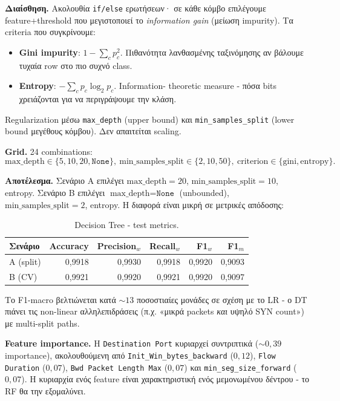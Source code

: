 \documentclass[12pt,a4paper,twoside]{book}
\begin{document}
\textbf{Διαίσθηση.} Ακολουθία \texttt{if/else} ερωτήσεων· σε κάθε
κόμβο επιλέγουμε feature+threshold που μεγιστοποιεί το
\emph{information gain} (μείωση impurity). Τα criteria που
συγκρίνουμε:
\begin{itemize}
    \item \textbf{Gini impurity}: \(1 - \sum_c p_c^2\). Πιθανότητα
    λανθασμένης ταξινόμησης αν βάλουμε τυχαία row στο πιο συχνό class.
    \item \textbf{Entropy}: \(-\sum_c p_c \log_2 p_c\). Information-
    theoretic measure - πόσα bits χρειάζονται για να περιγράψουμε την
    κλάση.
\end{itemize}
Regularization μέσω \texttt{max\_depth} (upper bound) και
\texttt{min\_samples\_split} (lower bound μεγέθους κόμβου). Δεν
απαιτείται scaling.

\textbf{Grid.} 24 combinations:
\[
\text{max\_depth}\in\{5,10,20,\texttt{None}\},\
\text{min\_samples\_split}\in\{2,10,50\},\
\text{criterion}\in\{\text{gini},\text{entropy}\}.
\]

\textbf{Αποτέλεσμα.} Σενάριο A επιλέγει
\(\text{max\_depth}=20\), \(\text{min\_samples\_split}=10\), entropy.
Σενάριο B επιλέγει \(\text{max\_depth}=\texttt{None}\) (unbounded),
\(\text{min\_samples\_split}=2\), entropy. Η διαφορά είναι μικρή σε
μετρικές απόδοσης:

\begin{table}[H]
    \centering
    \begin{tabular}{lrrrrr}
        \toprule
        \textbf{Σενάριο} & \textbf{Accuracy} & \textbf{Precision\(_w\)}
        & \textbf{Recall\(_w\)} & \textbf{F1\(_w\)} & \textbf{F1\(_m\)} \\
        \midrule
        A (split) & 0,9918 & 0,9930 & 0,9918 & 0,9920 & 0,9093 \\
        B (CV)    & 0,9921 & 0,9920 & 0,9921 & 0,9920 & 0,9097 \\
        \bottomrule
    \end{tabular}
    \caption{Decision Tree - test metrics.}\label{tab:q2_dt}
\end{table}

Το F1-macro βελτιώνεται κατά \(\sim 13\) ποσοστιαίες μονάδες σε σχέση
με το LR - ο DT πιάνει τις non-linear αλληλεπιδράσεις (π.χ. «μικρά
packets \emph{και} υψηλό SYN count») με multi-split paths.

\textbf{Feature importance.} Η \texttt{Destination Port} κυριαρχεί
συντριπτικά (\(\sim 0{,}39\) importance), ακολουθούμενη από
\texttt{Init\_Win\_bytes\_backward} (\(0{,}12\)), \texttt{Flow Duration}
(\(0{,}07\)), \texttt{Bwd Packet Length Max} (\(0{,}07\)) και
\texttt{min\_seg\_size\_forward} (\(0{,}07\)). Η κυριαρχία ενός
feature είναι χαρακτηριστική ενός μεμονωμένου δέντρου - το RF θα την
εξομαλύνει.
\end{document}
